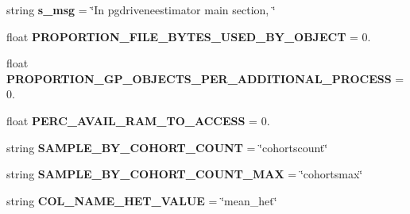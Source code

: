\begin{DoxyCompactItemize}
\item 
string {\bfseries s\+\_\+msg} = \char`\"{}In pgdriveneestimator main section, \char`\"{}\hypertarget{namespacenegui_1_1pgdriveneestimator_a167b017a9b7a41a2002208686cc6955e}{}\label{namespacenegui_1_1pgdriveneestimator_a167b017a9b7a41a2002208686cc6955e}

\item 
float {\bfseries P\+R\+O\+P\+O\+R\+T\+I\+O\+N\+\_\+\+F\+I\+L\+E\+\_\+\+B\+Y\+T\+E\+S\+\_\+\+U\+S\+E\+D\+\_\+\+B\+Y\+\_\+\+O\+B\+J\+E\+CT} = 0.\hypertarget{namespacenegui_1_1pgdriveneestimator_aac0c88c001b2a957689cba925d9de85a}{}\label{namespacenegui_1_1pgdriveneestimator_aac0c88c001b2a957689cba925d9de85a}

\item 
float {\bfseries P\+R\+O\+P\+O\+R\+T\+I\+O\+N\+\_\+\+G\+P\+\_\+\+O\+B\+J\+E\+C\+T\+S\+\_\+\+P\+E\+R\+\_\+\+A\+D\+D\+I\+T\+I\+O\+N\+A\+L\+\_\+\+P\+R\+O\+C\+E\+SS} = 0.\hypertarget{namespacenegui_1_1pgdriveneestimator_a257f80975601ec1f262e61da94aab595}{}\label{namespacenegui_1_1pgdriveneestimator_a257f80975601ec1f262e61da94aab595}

\item 
float {\bfseries P\+E\+R\+C\+\_\+\+A\+V\+A\+I\+L\+\_\+\+R\+A\+M\+\_\+\+T\+O\+\_\+\+A\+C\+C\+E\+SS} = 0.\hypertarget{namespacenegui_1_1pgdriveneestimator_a20fbee9f220ed1031975161c1f2a679e}{}\label{namespacenegui_1_1pgdriveneestimator_a20fbee9f220ed1031975161c1f2a679e}

\item 
string {\bfseries S\+A\+M\+P\+L\+E\+\_\+\+B\+Y\+\_\+\+C\+O\+H\+O\+R\+T\+\_\+\+C\+O\+U\+NT} = \char`\"{}cohortscount\char`\"{}\hypertarget{namespacenegui_1_1pgdriveneestimator_a40ebaca8593fd1dbd1ad94f1718f4e28}{}\label{namespacenegui_1_1pgdriveneestimator_a40ebaca8593fd1dbd1ad94f1718f4e28}

\item 
string {\bfseries S\+A\+M\+P\+L\+E\+\_\+\+B\+Y\+\_\+\+C\+O\+H\+O\+R\+T\+\_\+\+C\+O\+U\+N\+T\+\_\+\+M\+AX} = \char`\"{}cohortsmax\char`\"{}\hypertarget{namespacenegui_1_1pgdriveneestimator_ae8fc9fdec47a0df16a055fdf4a9f693f}{}\label{namespacenegui_1_1pgdriveneestimator_ae8fc9fdec47a0df16a055fdf4a9f693f}

\item 
string {\bfseries C\+O\+L\+\_\+\+N\+A\+M\+E\+\_\+\+H\+E\+T\+\_\+\+V\+A\+L\+UE} = \char`\"{}mean\+\_\+het\char`\"{}\hypertarget{namespacenegui_1_1pgdriveneestimator_a8dcfc49c319774f0b7850d01d806781b}{}\label{namespacenegui_1_1pgdriveneestimator_a8dcfc49c319774f0b7850d01d806781b}

\end{DoxyCompactItemize}


